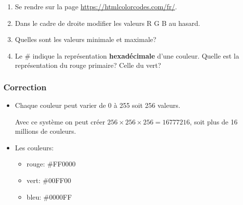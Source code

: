 \documentclass[svgnames,11pt]{beamer}
\begin{document}
\begin{frame}
    \frametitle{}

    \begin{activite}
        \begin{enumerate}
            \item Se rendre sur la page \url{https://htmlcolorcodes.com/fr/}.
            \item Dans le cadre de droite modifier les valeurs R G B au hasard.
            \item Quelles sont les valeurs minimale et maximale?
            \item Le \# indique la représentation \textbf{hexadécimale} d'une couleur. Quelle est la représentation du rouge primaire? Celle du vert?
        \end{enumerate}
    \end{activite}

\end{frame}
\begin{frame}
    \frametitle{Correction}

    \begin{itemize}
        \item Chaque couleur peut varier de 0 à 255 soit 256 valeurs.
              \begin{aretenir}[]
                  Avec ce système on peut créer $256×256×256=16777216$, soit plus de 16 millions de couleurs.
              \end{aretenir}
        \item Les couleurs:
              \begin{itemize}
                  \item rouge: \#FF0000
                  \item vert: \#00FF00
                  \item bleu: \#0000FF
              \end{itemize}
    \end{itemize}

\end{frame}
\end{document}

